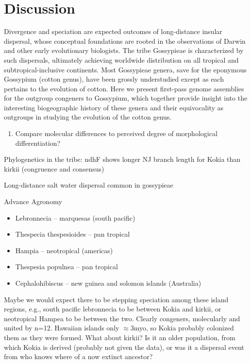 \documentclass[10pt,letterpaper]{article}
\begin{document}
\section*{Discussion}

Divergence and speciation are expected outcomes of long-distance insular
dispersal, whose conceptual foundations are rooted in the observations of Darwin
and other early evolutionary biologists. The tribe Gossypieae is characterized
by such dispersals, ultimately achieving worldwide distribution on all tropical
and subtropical-inclusive continents. Most Gossypieae genera, save for the
eponymous Gossypium (cotton genus), have been grossly understudied except as
each pertains to the evolution of cotton. Here we present first-pass genome
assemblies for the outgroup congeners to Gossypium, which together provide
insight into the interesting biogeographic history of these genera and their
equivocality as outgroups in studying the evolution of the cotton genus.

\begin{enumerate}
\item Compare molecular differences to perceived degree of morphological differentiation?
\end{enumerate}

{
  \color{Blue}
Phylogenetics in the tribe: ndhF shows longer NJ branch length for Kokia than kirkii (congruence and consensus)

Long-distance salt water dispersal common in gossypieae


Advance Agronomy
\begin{itemize}
\item Lebronnecia – marquesas (south pacific)
\item Thespecia thespesioides – pan tropical
\item Hampia – neotropical (americas)
\item Thespesia populnea – pan tropical
\item Cephalohibiscus – new guinea and solomon islands (Australia)
\end{itemize}

Maybe we would expect there to be stepping speciation among these island
regions, e.g., south pacific lebronnecia to be between Kokia and kirkii, or
neotropical Hampea to be between the two. Clearly congeners, molecularly and
united by n=12. Hawaiian islands only $\approx$3myo, so Kokia probably colonized them as
they were formed. What about kirkii? Is it an older population, from which Kokia
is derived (probably not given the data), or was it a dispersal event from who
knows where of a now extinct ancestor?

}
\end{document}
